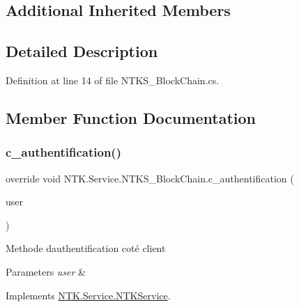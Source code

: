 \subsection*{Additional Inherited Members}


\subsection{Detailed Description}




Definition at line 14 of file N\+T\+K\+S\+\_\+\+Block\+Chain.\+cs.



\subsection{Member Function Documentation}
\mbox{\label{class_n_t_k_1_1_service_1_1_n_t_k_s___block_chain_ab29505226ecfe9bce4385aaa776a14d7}} 
\subsubsection{\texorpdfstring{c\_authentification()}{c\_authentification()}}
{\footnotesize\ttfamily override void N\+T\+K.\+Service.\+N\+T\+K\+S\+\_\+\+Block\+Chain.\+c\+\_\+authentification (\begin{DoxyParamCaption}\item[{\mbox{\hyperlink{class_n_t_k_1_1_n_t_k_user}{N\+T\+K\+User}}}]{user }\end{DoxyParamCaption})\hspace{0.3cm}{\ttfamily [virtual]}}



Methode d\textquotesingle{}authentification coté client 


\begin{DoxyParams}{Parameters}
{\em user} & \\
\hline
\end{DoxyParams}


Implements \mbox{\hyperlink{class_n_t_k_1_1_service_1_1_n_t_k_service_a8c2fd33b41da5a4edf9911682dfd36cd}{N\+T\+K.\+Service.\+N\+T\+K\+Service}}.



